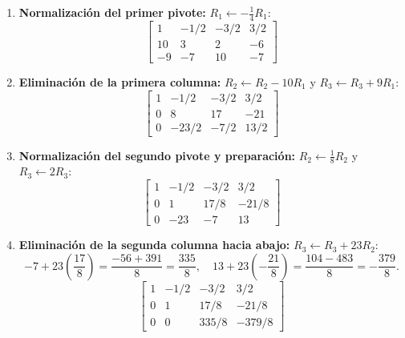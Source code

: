 \documentclass[spanish,letterpaper,oneside]{article}
\begin{document}
\begin{enumerate}
\item \textbf{Normalización del primer pivote:} $R_1 \leftarrow -\frac{1}{4} R_1$:
\begin{equation*}
\left[\begin{array}{rrr|r}
1 & -1/2 & -3/2 & 3/2 \\
10 & 3 & 2 & -6 \\
-9 & -7 & 10 & -7
\end{array}\right]
\end{equation*}

\item \textbf{Eliminación de la primera columna:} $R_2 \leftarrow R_2 - 10R_1$ y $R_3 \leftarrow R_3 + 9R_1$:
\begin{equation*}
\left[\begin{array}{rrr|r}
1 & -1/2 & -3/2 & 3/2 \\
0 & 8 & 17 & -21 \\
0 & -23/2 & -7/2 & 13/2
\end{array}\right]
\end{equation*}

\item \textbf{Normalización del segundo pivote y preparación:} $R_2 \leftarrow \frac{1}{8} R_2$ y $R_3 \leftarrow 2R_3$:
\begin{equation*}
\left[\begin{array}{rrr|r}
1 & -1/2 & -3/2 & 3/2 \\
0 & 1 & 17/8 & -21/8 \\
0 & -23 & -7 & 13
\end{array}\right]
\end{equation*}

\item \textbf{Eliminación de la segunda columna hacia abajo:} $R_3 \leftarrow R_3 + 23R_2$:
\begin{equation*}
-7 + 23\left(\frac{17}{8}\right) = \frac{-56 + 391}{8} = \frac{335}{8}, \quad
13 + 23\left(-\frac{21}{8}\right) = \frac{104 - 483}{8} = -\frac{379}{8}.
\end{equation*}
\begin{equation*}
\left[\begin{array}{rrr|r}
1 & -1/2 & -3/2 & 3/2 \\
0 & 1 & 17/8 & -21/8 \\
0 & 0 & 335/8 & -379/8
\end{array}\right]
\end{equation*}


\end{enumerate}
\end{document}
